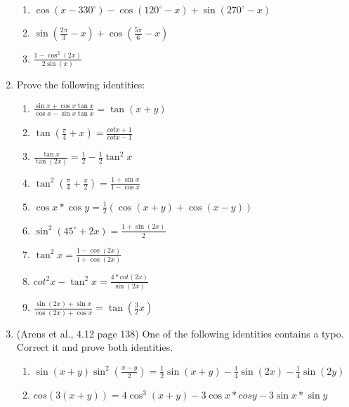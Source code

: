 \documentclass[a4paper,onecolumn,draft,pdftex]{report}
\begin{document}
\begin{enumerate}
\begin{enumerate}
                \item $\cos(x-330^\circ)-\cos(120^\circ-x)+\sin(270^\circ-x)$
                \item $\sin(\frac{2\pi}{3}-x)+\cos(\frac{5\pi}{6}-x)$
                \item $\frac{1-\cos^2(2x)}{2\sin(x)}$
            \end{enumerate}
        \item Prove the following identities:
            \begin{enumerate}
                \item $\frac{\sin x+\cos x\tan x}{\cos x-\sin x\tan x} = \tan(x+y)$
                \item $\tan(\frac{\pi}{4}+x)=\frac{cot x+1}{cot x-1}$
                \item $\frac{\tan x}{\tan(2x)}=\frac{1}{2}-\frac{1}{2}\tan^2 x$
                \item $\tan^2(\frac{\pi}{4}+\frac{x}{2})=\frac{1+\sin x}{1-\cos x}$
                \item $\cos x*\cos y=\frac{1}{2}(\cos(x+y)+\cos(x-y))$
                \item $\sin^2(45^\circ+2x)=\frac{1+\sin(2x)}{2}$
                \item $\tan^2 x=\frac{1-\cos(2x)}{1+\cos(2x)}$
                \item $cot^2 x-\tan^2 x=\frac{4*cot(2x)}{\sin(2x)}$
                \item $\frac{\sin(2x)+\sin x}{\cos(2x)+\cos x}=\tan(\frac{3}{2}x)$
            \end{enumerate}
        \item (Arens et al., 4.12 page 138) One of the following identities contains a typo. Correct it and prove both identities.
            \begin{enumerate}
                \item $\sin(x+y)\sin^2(\frac{x-y}{2})=\frac{1}{2}\sin(x+y)-\frac{1}{4}\sin(2x)-\frac{1}{4}\sin(2y)$
                \item $cos(3(x+y))=4\cos^3(x+y)-3\cos x*cos y-3\sin x*\sin y$
            \end{enumerate}
    \end{enumerate}
\end{document}
